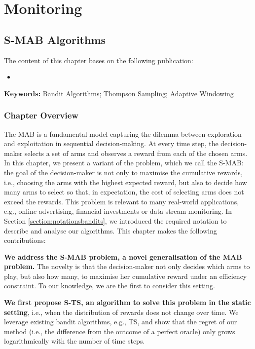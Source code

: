 \part{Monitoring}
\label{partIII}

\chapter{\acrlong{S-MAB} Algorithms}
\glsresetall
\label{chapter:S-MAB}

The content of this chapter bases on the following publication: 
\begin{itemize}[noitemsep]
	\item {}
\end{itemize}
\textbf{Keywords:} Bandit Algorithms; Thompson Sampling; Adaptive Windowing%

\section{Chapter Overview}

The \gls{MAB} is a fundamental model capturing the dilemma between exploration and exploitation in sequential decision-making. 
At every time step, the decision-maker selects a set of arms and observes a reward from each of the chosen arms. 
In this chapter, we present a variant of the problem, which we call the \gls{S-MAB}: the goal of the decision-maker is not only to maximise the cumulative rewards, i.e., choosing the arms with the highest expected reward, but also to decide how many arms to select so that, in expectation, the cost of selecting arms does not exceed the rewards. 
This problem is relevant to many real-world applications, e.g., online advertising, financial investments or data stream monitoring. In Section \ref{section:notationsbandits}, we introduced the required notation to describe and analyse our algorithms. This chapter makes the following contributions:  

\textbf{We address the \gls{S-MAB} problem, a novel generalisation of the \gls{MAB} problem.} The novelty is that the decision-maker not only decides which arms to play, but also how many, to maximise her cumulative reward under an efficiency constraint. 
To our knowledge, we are the first to consider this setting.   

\textbf{We first propose \gls{S-TS}, an algorithm to solve this problem in the static setting}, i.e., when the distribution of rewards does not change over time. 
We leverage existing bandit algorithms, e.g., \gls{TS}, and show that the regret of our method (i.e., the difference from the outcome of a perfect oracle) %
only grows logarithmically with the number of time steps. 

